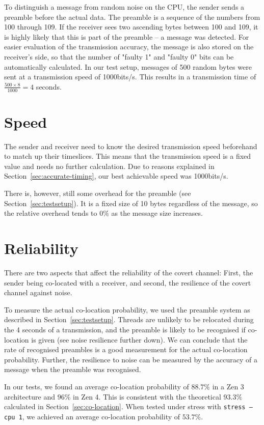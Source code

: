 \documentclass[11pt,
  titlepage=false,
]{scrreprt}
\begin{document}
To distinguish a message from random noise on the CPU, the sender sends a preamble before the actual data.
The preamble is a sequence of the numbers from 100 through 109.
If the receiver sees two ascending bytes between 100 and 109, it is highly likely that this is part of the preamble --
a message was detected.
For easier evaluation of the transmission accuracy, the message is also stored on the receiver's side,
so that the number of "faulty 1" and "faulty 0" bits can be automatically calculated.
In our test setup, messages of 500 random bytes were sent at a transmission speed of 1000bits/s.
This results in a transmission time of $\frac{500 \times 8}{1000} = 4$ seconds.

\section{Speed}
The sender and receiver need to know the desired transmission speed beforehand to match up their timeslices.
This means that the transmission speed is a fixed value and needs no further calculation.
Due to reasons explained in Section~\ref{sec:accurate-timing}, our best achievable speed was 1000bits/s.

There is, however, still some overhead for the preamble (see Section~\ref{sec:testsetup}).
It is a fixed size of 10 bytes regardless of the message,
so the relative overhead tends to $0\%$ as the message size increases.

\section{Reliability}
There are two aspects that affect the reliability of the covert channel:
First, the sender being co-located with a receiver, and second, the resilience of the covert channel against noise.

To measure the actual co-location probability, we used the preamble system as described in Section~\ref{sec:testsetup}.
Threads are unlikely to be relocated during the 4 seconds of a transmission,
and the preamble is likely to be recognised if co-location is given (see noise resilience further down).
We can conclude that the rate of recognised preambles is a good measurement for the actual co-location probability.
Further, the resilience to noise can be measured by the accuracy of a message when the preamble was recognised.

In our tests, we found an average co-location probability of $88.7\%$ in a Zen 3 architecture and $96\%$ in Zen 4.
This is consistent with the theoretical $93.3\%$ calculated in Section~\ref{sec:co-location}.
When tested under stress with \texttt{stress --cpu 1}, we achieved an average co-location probability of $53.7\%$.
\end{document}
